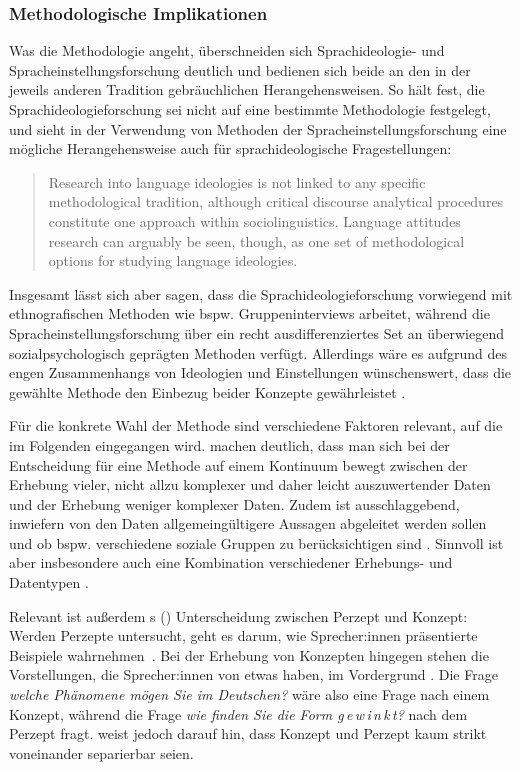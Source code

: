 \subsubsection{Methodologische Implikationen}
\label{sec:Methodologie}
Was die Methodologie angeht, überschneiden sich Sprachideologie- und Spracheinstellungsforschung deutlich und bedienen sich beide an den in der jeweils anderen Tradition gebräuchlichen Herangehensweisen. 
So hält \citet{Garrett.2012} fest, die Sprachideologieforschung sei nicht auf eine bestimmte Methodologie festgelegt, und sieht in der Verwendung von Methoden der Spracheinstellungsforschung eine mögliche Herangehensweise auch für sprachideologische Fragestellungen: 
\begin{quote}Research into language ideologies is not linked to any specific methodological tradition, although critical discourse analytical procedures constitute one approach within sociolinguistics. Language attitudes research can arguably be seen, though, as one set of methodological options for studying language ideologies.~\citep[35]{Garrett.2012}\end{quote}
Insgesamt lässt sich aber sagen, dass die Sprachideologieforschung vorwiegend mit ethnografischen Methoden wie bspw. Gruppeninterviews arbeitet, während die Spracheinstellungsforschung über ein recht ausdifferenziertes Set an überwiegend {so\-zial\-psycho\-lo\-gisch} geprägten Methoden verfügt. 
Allerdings wäre es aufgrund des engen Zusammenhangs von Ideologien und Einstellungen wünschenswert, dass die gewählte Methode den Einbezug beider Konzepte gewährleistet \citep[s.][196]{Liebscher.2009}.

Für die konkrete Wahl der Methode sind verschiedene Faktoren relevant, auf die im Folgenden eingegangen wird.
\citet[64]{Adler.2018} machen deutlich, dass man sich bei der Entscheidung für eine Methode auf einem Kontinuum bewegt zwischen der Erhebung vieler, nicht allzu komplexer und daher leicht auszuwertender Daten und der Erhebung weniger komplexer Daten. 
Zudem ist ausschlaggebend, inwiefern von den Daten allgemeingültigere Aussagen abgeleitet werden sollen und ob bspw. verschiedene soziale Gruppen zu berücksichtigen sind \citep[s.][64]{Adler.2018}. 
Sinnvoll ist aber insbesondere auch eine Kombination verschiedener Erhebungs- und Datentypen \citep[s.][144--145]{Soukup.2014}.

Relevant ist außerdem \citeauthor{Preston2010b}s (\citeyear{Preston2010b}) Unterscheidung zwischen Perzept und Konzept: Werden Perzepte untersucht, geht es darum, wie Sprecher:innen pr{\"a}sentierte Beispiele wahrnehmen~\citep[1--2]{Preston2010b}. 
Bei der Erhebung von Konzepten hingegen stehen die Vorstellungen, die Sprecher:innen von etwas haben, im Vordergrund \citep[1]{Preston2010b}. 
Die Frage \textit{welche Phänomene mögen Sie im Deutschen?} wäre also eine Frage nach einem Konzept, während die Frage \textit{wie finden Sie die Form g\,e\,w\,i\,n\,k\,t?} nach dem Perzept fragt. 
\citet[2--3]{Preston2010b} weist jedoch darauf hin, dass Konzept und Perzept kaum strikt voneinander separierbar seien.

